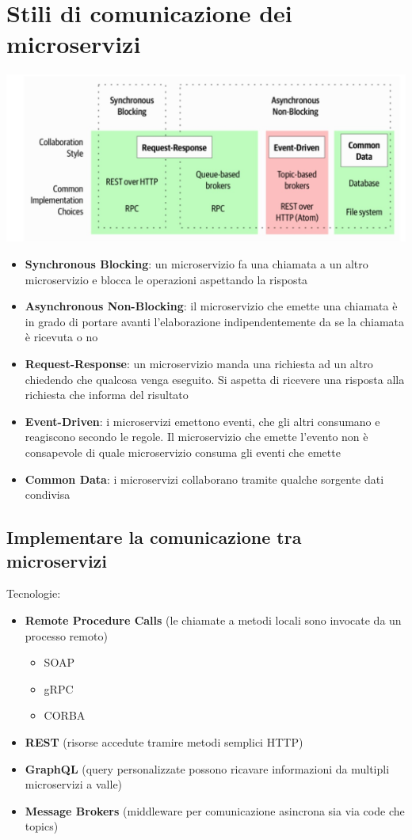 \section{Stili di comunicazione dei microservizi}
\begin{center}
    \includegraphics[scale = 0.4]{Images/SOA/MicroservicesCommunicationStyles.jpg}
\end{center}
\begin{itemize}
    \item \textbf{Synchronous Blocking}: un microservizio fa una chiamata a un altro microservizio e blocca le operazioni aspettando la risposta
    \item \textbf{Asynchronous Non-Blocking}: il microservizio che emette una chiamata è in grado di portare avanti l'elaborazione indipendentemente da se la chiamata è ricevuta o no
    \item \textbf{Request-Response}: un microservizio manda una richiesta ad un altro chiedendo che qualcosa venga eseguito. Si aspetta di ricevere una risposta alla richiesta che informa del risultato
    \item \textbf{Event-Driven}: i microservizi emettono eventi, che gli altri consumano e reagiscono secondo le regole. Il microservizio che emette l'evento non è consapevole di quale microservizio consuma gli eventi che emette
    \item \textbf{Common Data}: i microservizi collaborano tramite qualche sorgente dati condivisa
\end{itemize}

\subsection{Implementare la comunicazione tra microservizi}
Tecnologie:
\begin{itemize}
    \item \textbf{Remote Procedure Calls} (le chiamate a metodi locali sono invocate da un processo remoto)
    \begin{itemize}
        \item SOAP
        \item gRPC
        \item CORBA
    \end{itemize}
    \item \textbf{REST} (risorse accedute tramire metodi semplici HTTP)
    \item \textbf{GraphQL} (query personalizzate possono ricavare informazioni da multipli microservizi a valle)
    \item \textbf{Message Brokers} (middleware per comunicazione asincrona sia via code che topics)
\end{itemize}

